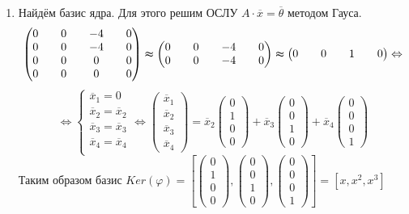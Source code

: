 \documentclass[a4paper]{article}
\begin{document}
\begin{enumerate}
\begin{enumerate}
		\end{enumerate}
		\item Найдём базис ядра. Для этого решим ОСЛУ $A\cdot\overline{x} = \overline{\theta}$ методом Гауса.
		$$\begin{pmatrix} 0 && 0 && -4 && 0 \\ 0 && 0 && -4 && 0 \\ 0 && 0 && 0 && 0 \\ 0 && 0 && 0 && 0 \end{pmatrix}\thickapprox\begin{pmatrix} 0 && 0 && -4 && 0 \\ 0 && 0 && -4 && 0\end{pmatrix}\thickapprox\begin{pmatrix} 0 && 0 && 1 && 0\end{pmatrix}\Leftrightarrow$$
		$$\Leftrightarrow\begin{cases}
			\overline{x}_1 = 0\\
			\overline{x}_2 = \overline{x}_2\\
			\overline{x}_3 = \overline{x}_3\\
			\overline{x}_4 = \overline{x}_4\\
		\end{cases}
		\Leftrightarrow
		\begin{pmatrix} \overline{x}_1 \\ \overline{x}_2 \\ \overline{x}_3 \\ \overline{x}_4 \end{pmatrix}=
		\overline{x}_2\begin{pmatrix} 0 \\ 1 \\ 0 \\ 0 \end{pmatrix}+
		\overline{x}_3\begin{pmatrix} 0 \\ 0 \\ 1 \\ 0 \end{pmatrix}+
		\overline{x}_4\begin{pmatrix} 0 \\ 0 \\ 0 \\ 1 \end{pmatrix}
		$$
		Таким образом базис $Ker(\varphi)=[\begin{pmatrix} 0 \\ 1 \\ 0 \\ 0 \end{pmatrix}, \begin{pmatrix} 0 \\ 0 \\ 1 \\ 0 \end{pmatrix}, \begin{pmatrix} 0 \\ 0 \\ 0 \\ 1 \end{pmatrix}] = [x, x^2, x^3]$

\end{enumerate}
\end{document}
